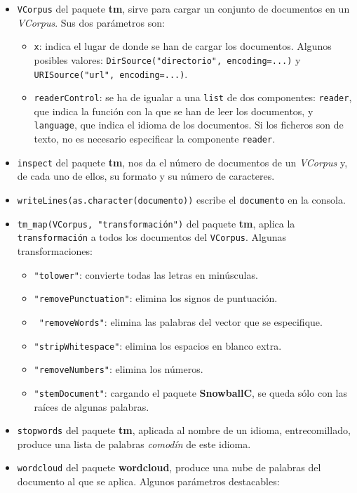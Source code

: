 \documentclass[
]{book}
\theoremstyle{definition}
\theoremstyle{definition}
\theoremstyle{definition}
\theoremstyle{remark}
\begin{document}
\begin{itemize}
\item
  \texttt{VCorpus} del paquete \textbf{tm}, sirve para cargar un conjunto de documentos en un \emph{VCorpus}. Sus dos parámetros son:

  \begin{itemize}
  \item
    \texttt{x}: indica el lugar de donde se han de cargar los documentos. Algunos posibles valores:
    \texttt{DirSource("directorio",\ encoding=...)} y \texttt{URISource("url",\ encoding=...)}.
  \item
    \texttt{readerControl}: se ha de igualar a una \texttt{list} de dos componentes: \texttt{reader}, que indica la función con la que se han de leer los documentos, y \texttt{language}, que indica el idioma de los documentos. Si los ficheros son de texto, no es necesario especificar la componente \texttt{reader}.
  \end{itemize}
\item
  \texttt{inspect} del paquete \textbf{tm}, nos da el número de documentos de un \emph{VCorpus} y, de cada uno de ellos, su formato y su número de caracteres.
\item
  \texttt{writeLines(as.character(documento))} escribe el \texttt{documento} en la consola.
\item
  \texttt{tm\_map(VCorpus,\ "transformación")} del paquete \textbf{tm}, aplica la \texttt{transformación} a todos los documentos del \texttt{VCorpus}. Algunas transformaciones:

  \begin{itemize}
  \item
    \verb+"tolower"+: convierte todas las letras en minúsculas.
  \item
    \verb+"removePunctuation"+: elimina los signos de puntuación.
  \item
    \verb+ "removeWords"+: elimina las palabras del vector que se especifique.
  \item
    \texttt{"stripWhitespace"}: elimina los espacios en blanco extra.
  \item
    \verb+"removeNumbers"+: elimina los números.
  \item
    \texttt{"stemDocument"}: cargando el paquete \textbf{SnowballC}, se queda sólo con las raíces de algunas palabras.
  \end{itemize}
\item
  \texttt{stopwords} del paquete \textbf{tm}, aplicada al nombre de un idioma, entrecomillado, produce una lista de palabras \emph{comodín} de este idioma.
\item
  \texttt{wordcloud} del paquete \textbf{wordcloud}, produce una nube de palabras del documento al que se aplica. Algunos parámetros destacables:


\end{itemize}
\end{document}
